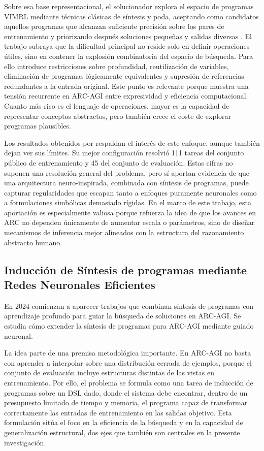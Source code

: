 \documentclass[11pt,a4paper,spanish]{book}
\numberwithin{equation}{chapter}
\numberwithin{figure}{chapter}
\begin{document}
Sobre esa base representacional, el solucionador explora el espacio de programas VIMRL mediante técnicas clásicas de síntesis y poda, aceptando como 
candidatos aquellos programas que alcanzan suficiente precisión sobre los pares de entrenamiento y priorizando después soluciones pequeñas y salidas 
diversas \cite{ainooson2023neurodiversity}. El trabajo subraya que la dificultad principal no reside solo en definir operaciones útiles, sino en contener 
la explosión combinatoria del espacio de búsqueda. Para ello introduce restricciones sobre profundidad, reutilización de variables, eliminación de programas 
lógicamente equivalentes y supresión de referencias redundantes a la entrada original. Este punto es relevante porque muestra una 
tensión recurrente en ARC-AGI entre expresividad y eficiencia computacional. Cuanto más rico es el lenguaje de operaciones, mayor es la capacidad de representar 
conceptos abstractos, pero también crece el coste de explorar programas plausibles.

Los resultados obtenidos por  respaldan el interés de este enfoque, aunque también dejan ver sus límites. Su mejor 
configuración resolvió 111 tareas del conjunto público de entrenamiento y 45 del conjunto de evaluación. Estas cifras no suponen una resolución general 
del problema, pero sí aportan evidencia de que una arquitectura neuro-inspirada, 
combinada con síntesis de programas, puede capturar regularidades que escapan tanto a enfoques puramente neuronales como a formulaciones simbólicas demasiado
rígidas. En el marco de este trabajo, esta aportación es especialmente valiosa porque refuerza la idea de que los avances en ARC no 
dependen únicamente de aumentar escala o parámetros, sino de diseñar mecanismos de inferencia mejor alineados con 
la estructura del razonamiento abstracto humano.

\subsection{Inducción de Síntesis de programas mediante Redes Neuronales Eficientes}

En 2024 comienzan a aparecer trabajos que combinan síntesis de programas con aprendizaje profundo para guiar la búsqueda de soluciones en ARC-AGI. Se estudia 
cómo extender la síntesis de programas para ARC-AGI mediante guiado neuronal.

La idea parte de una premisa metodológica importante. En ARC-AGI no basta con aprender a interpolar sobre una distribución cerrada de ejemplos, 
porque el conjunto de evaluación incluye estructuras distintas de las vistas en entrenamiento. Por ello, el problema se formula
como una tarea de inducción de programas sobre un DSL dado, donde el sistema debe encontrar, dentro de un presupuesto limitado de tiempo y 
memoria, el programa capaz de transformar correctamente las entradas de entrenamiento en las salidas objetivo. Esta formulación sitúa el foco en 
la eficiencia de la búsqueda y en la capacidad de generalización estructural, dos ejes que también son centrales en la presente investigación.
\end{document}
